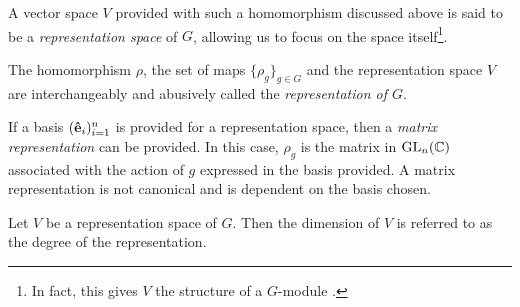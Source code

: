 \begin{notation}
	A vector space $V$ provided with such a homomorphism discussed above %
	is said to be a \textit{representation space} of $G$, allowing us to focus on the space itself\footnote{In fact, this gives $V$ the structure of a $G$-module \cite[1.3]{Sagan}.}.
\end{notation}

\begin{note}
	The homomorphism $\rho$, the set of maps $\{\rho_g\}_{g \in G}$ and the representation space $V$ are interchangeably and abusively called the \textit{representation of $G$}.
\end{note}


If a basis $(\mathbf{\hat{e}}_i)_{i=1}^n$ is provided for a representation space, then a \textit{matrix representation} can be provided. In this case, $\rho_g$ is the matrix in $\text{GL}_n(\mathbb{C})$ associated with the action of $g$ expressed in the basis provided. A matrix representation is not canonical and is dependent on the basis chosen.

\begin{definition}
	Let $V$ be a representation space of $G$. Then the dimension of $V$ is referred to as the degree of the representation.
\end{definition}	